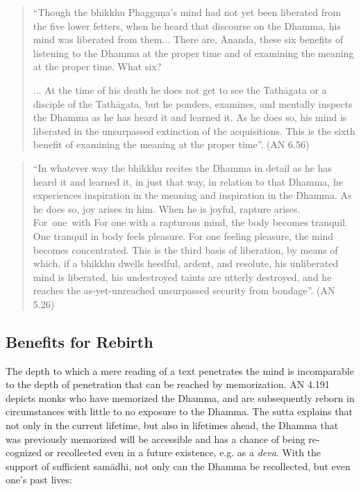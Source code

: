 \begin{quote}
  ``Though the bhikkhu Phagguṇa's mind had not yet been liberated from the five lower fetters, when he heard that discourse on the Dhamma, his mind was liberated from them... There are, Ānanda, these six benefits of listening to the Dhamma at the proper time and of examining the meaning at the proper time. What six?

  ... At the time of his death he does not get to see the Tathāgata or a disciple of the Tathāgata, but he ponders, examines, and mentally inspects the Dhamma as he has heard it and learned it. As he does so, his mind is liberated in the unsurpassed extinction of the acquisitions. This is the sixth benefit of examining the meaning at the proper time''. (AN 6.56)
\end{quote}

\begin{quote}
  ``In whatever way the bhikkhu recites the Dhamma in detail as he has heard it and learned it, in just that way, in relation to that Dhamma, he experiences inspiration in the meaning and inspiration in the Dhamma. As he does so, joy arises in him. When he is joyful, rapture arises. \ifninebythirteenversion \mbox{For one}~with \else For one with \fi a rapturous mind, the body becomes tranquil. One tranquil in body feels pleasure. For one feeling pleasure, the mind becomes concentrated. This is the third basis of liberation, by means of which, if a bhikkhu dwells heedful, ardent, and resolute, his unliberated mind is liberated, his undestroyed taints are utterly destroyed, and he reaches the as-yet-unreached unsurpassed security from bondage''. (AN 5.26)
\end{quote}

\subsection*{Benefits for Rebirth}

The depth to which a mere reading of a text penetrates the mind is incomparable to the depth of penetration that can be reached by memorization. AN 4.191 depicts monks who have memorized the Dhamma, and are subsequently reborn in circumstances with little to no exposure to the Dhamma. The sutta explains that not only in the current lifetime, but also in lifetimes ahead, the Dhamma that was previously memorized will be accessible and has a chance of being re-cognized or recollected even in a future existence, e.g. as a \textit{deva}. With the support of sufficient samādhi, not only can the Dhamma be recollected, but even one's past lives:

